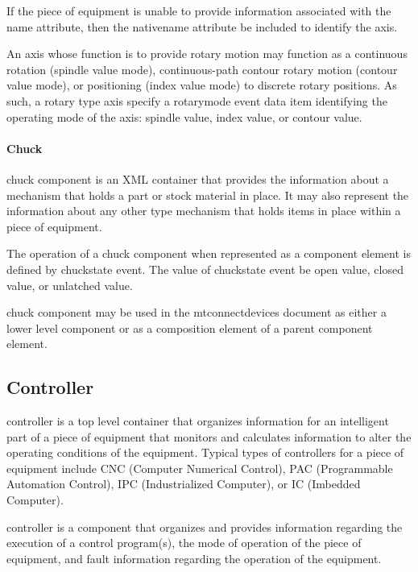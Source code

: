 \documentclass{mtconnect}	%
\begin{document}
If the piece of equipment is unable to provide information associated with the \gls{name} attribute, then the \gls{nativename} attribute \must be included to identify the axis.

An axis whose function is to provide rotary motion may function as a continuous rotation (\gls{spindle value} mode), continuous-path contour rotary motion (\gls{contour value} mode), or positioning (\gls{index value} mode) to discrete rotary positions.   As such, a \gls{rotary} type axis \should specify a \gls{rotarymode event} data item identifying the operating mode of the axis: \gls{spindle value}, \gls{index value}, or \gls{contour value}.

\paragraph{Chuck}\mbox{}

\gls{chuck component} is an XML container that provides the information about a mechanism that holds a part or stock material in place.   It may also represent the information about any other type mechanism that holds items in place within a piece of equipment.

The operation of a \gls{chuck component} when represented as a \gls{component} element is defined by \gls{chuckstate event}. The value of \gls{chuckstate event} \must be \gls{open value}, \gls{closed value}, or \gls{unlatched value}.

\gls{chuck component} may be used in the \gls{mtconnectdevices} document as either a \gls{lower level} component or as a \gls{composition} element of a parent \gls{component} element.

\subsection{Controller}

\gls{controller} is a \gls{top level} container that organizes information for an intelligent part of a piece of equipment that monitors and calculates information to alter the operating conditions of the equipment.  Typical types of controllers for a piece of equipment include CNC (Computer Numerical Control), PAC (Programmable Automation Control), IPC (Industrialized Computer), or IC (Imbedded Computer).

\gls{controller} is a component that organizes and provides information regarding the execution of a control program(s), the mode of operation of the piece of equipment, and fault information regarding the operation of the equipment.
\end{document}
